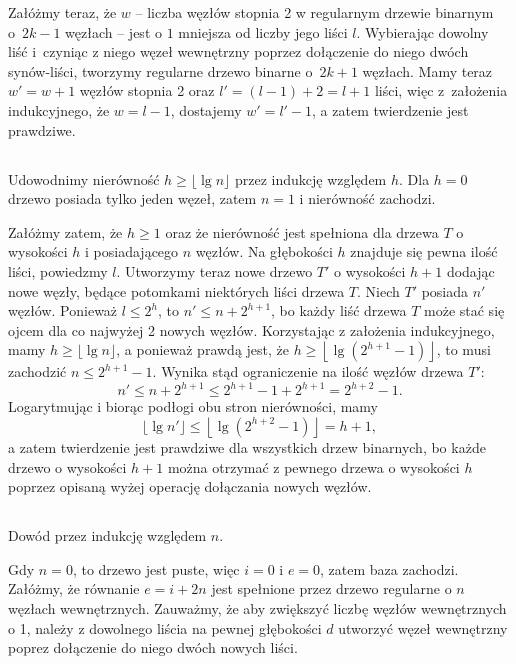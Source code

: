 Załóżmy teraz, że $w$ -- liczba węzłów stopnia 2 w regularnym drzewie binarnym o~$2k-1$ węzłach -- jest o $1$ mniejsza od liczby jego liści $l$. Wybierając dowolny liść i~czyniąc z niego węzeł wewnętrzny poprzez dołączenie do niego dwóch synów-liści, tworzymy regularne drzewo binarne o~$2k+1$ węzłach. Mamy teraz $w'=w+1$ węzłów stopnia 2 oraz $l'=(l-1)+2=l+1$ liści, więc z~założenia indukcyjnego, że $w=l-1$, dostajemy $w'=l'-1$, a zatem twierdzenie jest prawdziwe.

\subsection{} %
Udowodnimy nierówność $h\ge\lfloor\lg n\rfloor$ przez indukcję względem $h$. Dla $h=0$ drzewo posiada tylko jeden węzeł, zatem $n=1$ i nierówność zachodzi.

Załóżmy zatem, że $h\ge 1$ oraz że nierówność jest spełniona dla drzewa $T$ o wysokości $h$ i posiadającego $n$ węzłów. Na głębokości $h$ znajduje się pewna ilość liści, powiedzmy $l$. Utworzymy teraz nowe drzewo $T'$ o wysokości $h+1$ dodając nowe węzły, będące potomkami niektórych liści drzewa $T$. Niech $T'$ posiada $n'$ węzłów. Ponieważ $l\le2^h$, to $n'\le n+2^{h+1}$, bo każdy liść drzewa $T$ może stać się ojcem dla co najwyżej 2 nowych węzłów. Korzystając z założenia indukcyjnego, mamy $h\ge\lfloor\lg n\rfloor$, a ponieważ prawdą jest, że $h\ge\left\lfloor\lg(2^{h+1}-1)\right\rfloor$, to musi zachodzić $n\le 2^{h+1}-1$. Wynika stąd ograniczenie na ilość węzłów drzewa $T'$:
\[
	n' \le n+2^{h+1} \le 2^{h+1}-1+2^{h+1} = 2^{h+2}-1.
\]
Logarytmując i biorąc podłogi obu stron nierówności, mamy
\[
	\lfloor\lg n'\rfloor\le\left\lfloor\lg(2^{h+2}-1)\right\rfloor = h+1,
\]
a zatem twierdzenie jest prawdziwe dla wszystkich drzew binarnych, bo każde drzewo o wysokości $h+1$ można otrzymać z pewnego drzewa o wysokości $h$ poprzez opisaną wyżej operację dołączania nowych węzłów.

\subsection{} %
Dowód przez indukcję względem $n$.

Gdy $n=0$, to drzewo jest puste, więc $i=0$ i $e=0$, zatem baza zachodzi. Załóżmy, że równanie $e=i+2n$ jest spełnione przez drzewo regularne o $n$ węzłach wewnętrznych. Zauważmy, że aby zwiększyć liczbę węzłów wewnętrznych o 1, należy z dowolnego liścia na pewnej głębokości $d$ utworzyć węzeł wewnętrzny poprez dołączenie do niego dwóch nowych liści.

